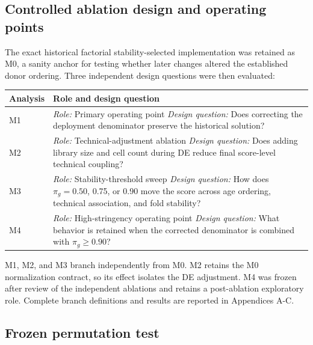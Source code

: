 \documentclass[10pt,twocolumn]{article}
\begin{document}
\subsection{Controlled ablation design and operating points}\label{controlled-ablation-design-and-operating-points}

The exact historical factorial stability-selected implementation was retained as M0, a sanity anchor for testing whether later changes altered the established donor ordering. Three independent design questions were then evaluated:

\noindent\begin{minipage}{\columnwidth}
\centering
\footnotesize
{}
\label{tab:ablation-design}
\begin{tabularx}{\columnwidth}{@{}l X@{}}
\toprule
Analysis & Role and design question \\
\midrule
M1 & \textit{Role:} Primary operating point \newline \textit{Design question:} Does correcting the deployment denominator preserve the historical solution? \\
M2 & \textit{Role:} Technical-adjustment ablation \newline \textit{Design question:} Does adding library size and cell count during DE reduce final score-level technical coupling? \\
M3 & \textit{Role:} Stability-threshold sweep \newline \textit{Design question:} How does \(\pi_g=0.50\), 0.75, or 0.90 move the score across age ordering, technical association, and fold stability? \\
M4 & \textit{Role:} High-stringency operating point \newline \textit{Design question:} What behavior is retained when the corrected denominator is combined with \(\pi_g\geq0.90\)? \\
\bottomrule
\end{tabularx}
\end{minipage}\par\medskip

M1, M2, and M3 branch independently from M0. M2 retains the M0 normalization contract, so its effect isolates the DE adjustment. M4 was frozen after review of the independent ablations and retains a post-ablation exploratory role. Complete branch definitions and results are reported in Appendices A-C.

\subsection{Frozen permutation test}\label{frozen-permutation-test}
\end{document}
